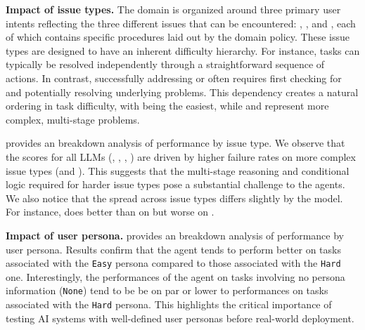 \textbf{Impact of issue types.}
The \telecom domain is organized around three primary user intents reflecting the three different issues that can be encountered: \serviceissue, \mobiledataissue, and \mmsissue, each of which contains specific procedures laid out by the domain policy.
These issue types are designed to have an inherent difficulty hierarchy. For instance, \serviceissue tasks can typically be resolved independently through a straightforward sequence of actions.  In contrast, successfully addressing \mobiledataissue or \mmsissue often requires first checking for and potentially resolving underlying \serviceissue problems.  This dependency creates a natural ordering in task difficulty, with \serviceissue being the easiest, while \mobiledataissue and \mmsissue represent more complex, multi-stage problems.



 provides an breakdown analysis of performance by issue type. We observe that the \passk scores for all LLMs (\gptmodelshort, \ofourmodelshort, \claudesonnetshort, \gptminishort) are driven by higher failure rates on more complex issue types (\mobiledataissue and \mmsissue). This suggests that the multi-stage reasoning and conditional logic required for harder issue types pose a substantial challenge to the agents. We also notice that the spread across issue types differs slightly by the model. For instance, \claudesonnetshort does better than \ofourmodelshort on \mobiledataissue but worse on \serviceissue.



\textbf{Impact of user persona.}
 provides an breakdown analysis of performance by user persona.
Results confirm that the agent tends to perform better on tasks associated with the \texttt{Easy} persona compared to those associated with the \texttt{Hard} one. Interestingly, the performances of the agent on tasks involving no persona information (\texttt{None}) tend to be be on par or lower to performances on tasks associated with the \texttt{Hard} persona. This highlights the critical importance of testing AI systems with well-defined user personas before real-world deployment.

